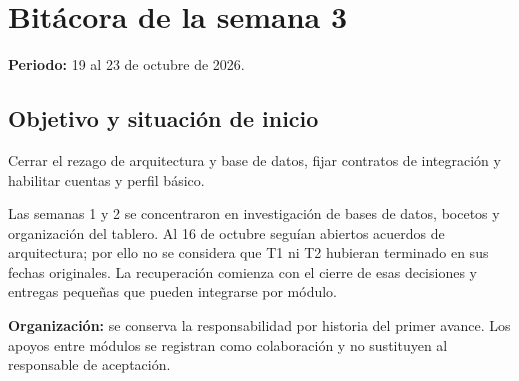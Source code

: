\section{Bitácora de la semana 3}
\textbf{Periodo:} 19 al 23 de octubre de 2026.

\notaBorrador

\subsection{Objetivo y situación de inicio}
Cerrar el rezago de arquitectura y base de datos, fijar contratos de integración y habilitar cuentas y perfil básico.

Las semanas 1 y 2 se concentraron en investigación de bases de datos, bocetos y organización del tablero. Al 16 de octubre seguían abiertos acuerdos de arquitectura; por ello no se considera que T1 ni T2 hubieran terminado en sus fechas originales. La recuperación comienza con el cierre de esas decisiones y entregas pequeñas que pueden integrarse por módulo.

\textbf{Organización:} se conserva la responsabilidad por historia del primer avance. Los apoyos entre módulos se registran como colaboración y no sustituyen al responsable de aceptación.

